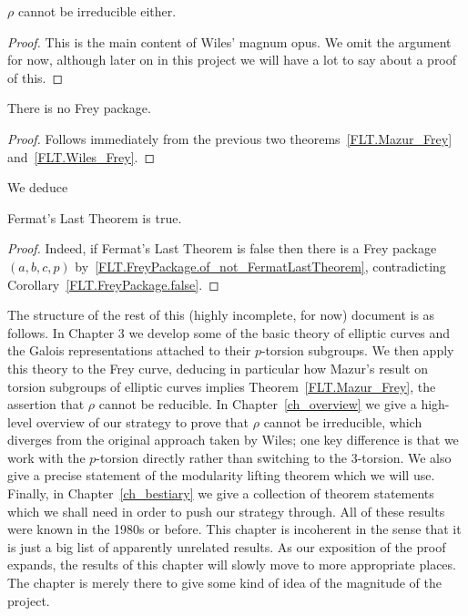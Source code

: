 \begin{theorem}\label{FLT.Wiles_Frey}\leanok $\rho$ cannot be irreducible either.\end{theorem}
\begin{proof}\notready This is the main content of Wiles' magnum opus. We omit the argument for now, although later on in this project we will have a lot to say about a proof of this.
\end{proof}

\begin{corollary}\label{FLT.FreyPackage.false}\leanok There is no Frey package.\end{corollary}
\begin{proof}\leanok Follows immediately from the previous two theorems~\ref{FLT.Mazur_Frey} and~\ref{FLT.Wiles_Frey}.\end{proof}

We deduce

\begin{corollary}\label{FLT}\leanok Fermat's Last Theorem is true.\end{corollary}
\begin{proof}\leanok
Indeed, if Fermat's Last Theorem is false then there is a Frey package $(a,b,c,p)$ by~\ref{FLT.FreyPackage.of_not_FermatLastTheorem}, contradicting Corollary~\ref{FLT.FreyPackage.false}.
\end{proof}

The structure of the rest of this (highly incomplete, for now) document is as follows. In Chapter 3 we develop some of the basic theory of elliptic curves and the Galois representations attached to their $p$-torsion subgroups. We then apply this theory to the Frey curve, deducing in particular how Mazur's result on torsion subgroups of elliptic curves implies Theorem~\ref{FLT.Mazur_Frey}, the assertion that $\rho$ cannot be reducible. In Chapter~\ref{ch_overview} we give a high-level overview of our strategy to prove that $\rho$ cannot be irreducible, which diverges from the original approach taken by Wiles; one key difference is that we work with the $p$-torsion directly rather than switching to the 3-torsion. We also give a precise statement of the modularity lifting theorem which we will use. Finally, in Chapter~\ref{ch_bestiary} we give a collection of theorem statements which we shall need in order to push our strategy through. All of these results were known in the 1980s or before. This chapter is incoherent in the sense that it is just a big list of apparently unrelated results. As our exposition of the proof expands, the results of this chapter will slowly move to more appropriate places. The chapter is merely there to give some kind of idea of the magnitude of the project.

